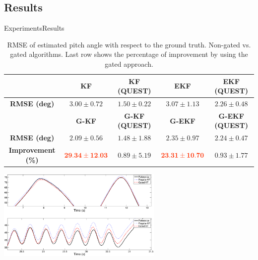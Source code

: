 \documentclass[10pt,aspectratio=1610]{beamer}
\begin{document}
\subsection{Results}
\label{subsec:results}
\begin{frame}{Experiments}{Results}
\begin{table}[t]
\centering
\caption{RMSE of estimated pitch angle with respect to the ground truth. Non-gated vs. gated algorithms. Last row shows the percentage of improvement by using the gated approach.}
\label{tab:results}
\scriptsize
\bgroup
\def\arraystretch{1.3}
\begin{tabular}{ | c | c | c | c | c |}
\hline
					&	\textbf{KF}				&	\textbf{KF (QUEST)}		&	\textbf{EKF}				& 	\textbf{EKF (QUEST)} 	\\\hline
\textbf{RMSE (deg)}			&	$3.00\pm0.72$	&	$1.50\pm0.22$	&	$3.07\pm1.13$	&	$2.26\pm0.48$	\\\hline
					&	\textbf{G-KF}			&	\textbf{G-KF (QUEST)}	&	\textbf{G-EKF}			& 	\textbf{G-EKF (QUEST)} 	\\\hline
\textbf{RMSE (deg)}			&	$2.09\pm0.56$	&	$1.48\pm1.88$	&	$2.35\pm0.97$	&	$2.24\pm0.47$	\\\hline
\textbf{Improvement (\%)} 	&	$\mathbf{\color{orangeUGR}{29.34\pm12.03}}$ &   $0.89\pm5.19$	&	$\mathbf{\color{orangeUGR}{23.31\pm10.70}}$&	$0.93\pm1.77$	\\
\hline
\end{tabular}
\egroup
\end{table}
\centering
\includegraphics[width=0.6\textwidth]{AAUgraphics/angles.eps}
\end{frame}


\end{document}
